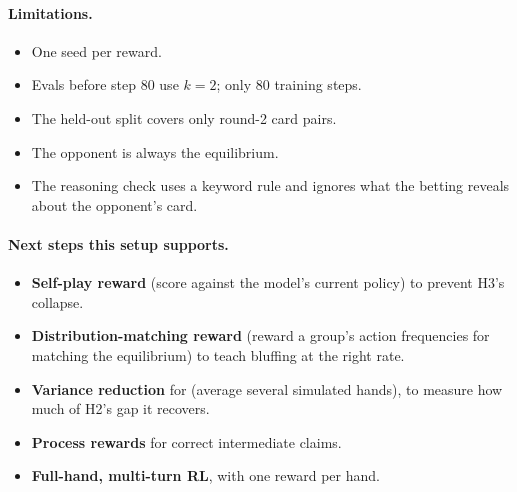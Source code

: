 \documentclass[10.5pt]{article}
\begin{document}
\paragraph{Limitations.}
\begin{itemize}
\item One seed per reward.
\item Evals before step 80 use $k=2$; only 80 training steps.
\item The held-out split covers only round-2 card pairs.
\item The opponent is always the equilibrium.
\item The reasoning check uses a keyword rule and ignores what the betting reveals about the opponent's card.
\end{itemize}

\paragraph{Next steps this setup supports.}
\begin{itemize}
\item \textbf{Self-play reward} (score against the model's current policy) to prevent H3's collapse.
\item \textbf{Distribution-matching reward} (reward a group's action frequencies for matching the equilibrium) to teach
  bluffing at the right rate.
\item \textbf{Variance reduction} for  (average several simulated hands), to measure how much of H2's gap it
  recovers.
\item \textbf{Process rewards} for correct intermediate claims.
\item \textbf{Full-hand, multi-turn RL}, with one reward per hand.
\end{itemize}
\end{document}
